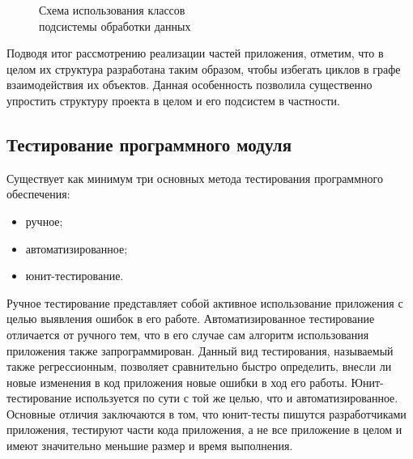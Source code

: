 \begin{figure}[h!]
  \centering
  \caption{Схема использования классов \\ подсистемы обработки данных}
  \label{fig:implementation_bl_presenter}
\end{figure}

Подводя итог рассмотрению реализации частей приложения, отметим,
что в целом их структура разработана таким образом,
чтобы избегать циклов в графе взаимодействия их объектов.
Данная особенность позволила существенно упростить
структуру проекта в целом и его подсистем в частности.



\subsection{Тестирование программного модуля}

Существует как минимум три основных метода тестирования
программного обеспечения:
\begin{itemize}
\item ручное;
\item автоматизированное;
\item юнит-тестирование.
\end{itemize}

Ручное тестирование представляет собой активное использование приложения
с целью выявления ошибок в его работе.
Автоматизированное тестирование отличается от ручного тем,
что в его случае сам алгоритм использования приложения также запрограммирован.
Данный вид тестирования, называемый также регрессионным,
позволяет сравнительно быстро определить,
внесли ли новые изменения в код приложения новые ошибки в ход его работы.
Юнит-тестирование используется по сути с той же целью,
что и автоматизированное. Основные отличия заключаются в том,
что юнит-тесты пишутся разработчиками приложения,
тестируют части кода приложения, а не все приложение в целом
и имеют значительно меньшие размер и время выполнения.

